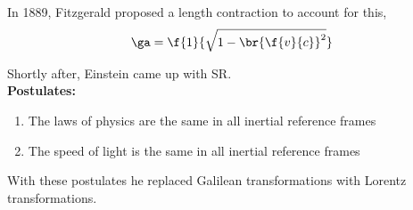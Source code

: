\documentclass{article}
\begin{document}
In 1889, Fitzgerald proposed a length contraction to account for this,
\[ \ga = \f{1}{\sqrt{1 - \br{\f{v}{c}}^2}} \]

Shortly after, Einstein came up with SR.\\

\textbf{Postulates:}
\begin{enumerate}
    \item The laws of physics are the same in all inertial reference frames
    \item The speed of light is the same in all inertial reference frames
\end{enumerate}

With these postulates he replaced Galilean transformations with Lorentz transformations.

\newcommand{\sqm}[1]{\begin{bmatrix}#1\end{bmatrix}}
\newcommand{\p}[1]{\texttt{#1}}
\newcommand{\arcd}[4]{%
\draw[<->] (90-#2:#1)
    arc[radius=#1, start angle=90-#2, end angle=90-(#3 + #2)/2]
    node[above] {#4}
    arc[radius=#1, start angle=90-(#3 + #2)/2, end angle=90-#3]
}
\newcommand{\spacetime}[5]{ %
    \begin{center}
    \begin{tikzpicture}[every path/.style={thick}]
        \pgfmathsetmacro{\maxx}{#1};
        \pgfmathsetmacro{\maxt}{#2};
        \pgfmathsetmacro{\ar}{#3};
        \pgfmathsetmacro{\br}{#4};
        \coordinate (x) at (\maxx, 0);
        \coordinate (t) at (0, \maxt);
        \coordinate (o) at (0, 0);
        \draw[gray, dashed] (o) -- ($(x)+(t)$) coordinate (u_r);
        \draw[blue, ->] (o) -- ([rotate=-\br]t) coordinate (t_p) node[above]{$t'$};
        \draw[blue, ->] (o) -- ([rotate=+\br]x) coordinate (x_p) node[right]{$x'$, \p{B}};
        \draw[red, ->]  (o) -- ([rotate=-\ar]t) coordinate (t)   node[above]{$t$};
        \draw[red, ->]  (o) -- ([rotate=+\ar]x) coordinate (x)   node[right]{$x$, \p{A}};
        #5
    \end{tikzpicture}
    \end{center}
}
\end{document}
